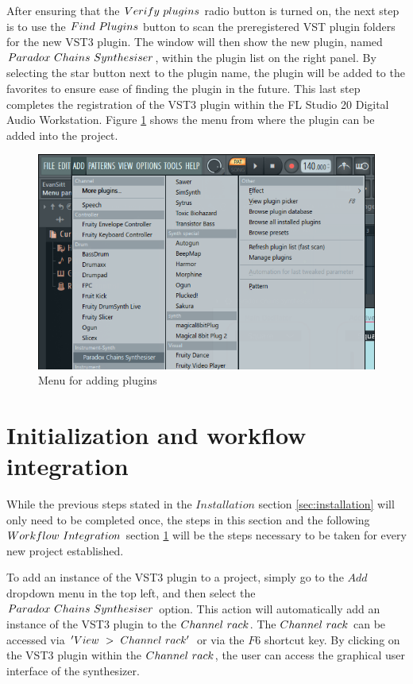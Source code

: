 \documentclass[a4paper,12pt]{report}
\begin{document}
After ensuring that the $Verify\ \-plugins$ radio button is turned on, the next step is to use the $Find\ \-Plugins$ button to scan the preregistered VST plugin folders for the new VST3 plugin. The window will then show the new plugin, named $Paradox\ \-Chains\ \-Synthesiser$, within the plugin list on the right panel. By selecting the star button next to the plugin name, the plugin will be added to the favorites to ensure ease of finding the plugin in the future. This last step completes the registration of the VST3 plugin within the FL Studio 20 Digital Audio Workstation. Figure \ref{fig:addplugin} shows the menu from where the plugin can be added into the project.

\begin{figure}[h] \centering
\includegraphics[width=32em]{AddPluginList.png}
    \caption{Menu for adding plugins}     \label{fig:addplugin} \end{figure}

\section{Initialization and workflow integration}
\label{sec:initandworkflow}
While the previous steps stated in the $Installation$ section \ref{sec:installation} will only need to be completed once, the steps in this section and the following $Workflow\ \-Integration$ section \ref{sec:initandworkflow} will be the steps necessary to be taken for every new project established.

To add an instance of the VST3 plugin to a project, simply go to the $Add$ dropdown menu in the top left, and then select the $Paradox\ \-Chains\ \-Synthesiser$ option. This action will automatically add an instance of the VST3 plugin to the $Channel\ \-rack$. The $Channel\ \-rack$ can be accessed via $'View\ \->\ \-Channel\ \-rack'$ or via the $F6$ shortcut key. By clicking on the VST3 plugin within the $Channel\ \-rack$, the user can access the graphical user interface of the synthesizer.
\end{document}

